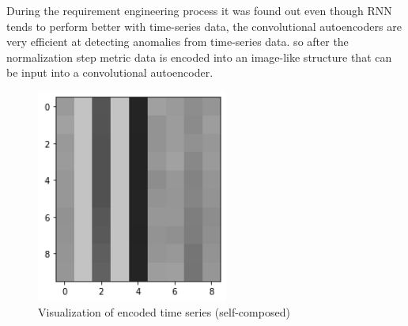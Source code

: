During the requirement engineering process it was found out even though RNN tends to perform better with time-series data, the convolutional autoencoders are very efficient at detecting anomalies from time-series data. so after the normalization step metric data is encoded into an image-like structure that can be input into a convolutional autoencoder.

\begin{figure}[H]
    \includegraphics[height=7cm]{assets/implementation/visualize-representation.png}
    \caption{Visualization of encoded time series (self-composed)}
    \label{fig:visualize-representation}
\end{figure}